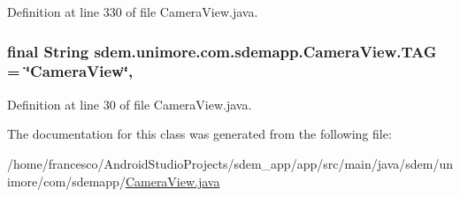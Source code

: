 Definition at line 330 of file Camera\+View.\+java.

\hypertarget{classsdem_1_1unimore_1_1com_1_1sdemapp_1_1_camera_view_a8a53915e6431e00f1220c305d16e999e}{
\subsubsection[{T\+A\+G}]{\setlength{\rightskip}{0pt plus 5cm}final String sdem.\+unimore.\+com.\+sdemapp.\+Camera\+View.\+T\+A\+G = \char`\"{}Camera\+View\char`\"{}\hspace{0.3cm}{\ttfamily [static]}, {\ttfamily [private]}}}\label{classsdem_1_1unimore_1_1com_1_1sdemapp_1_1_camera_view_a8a53915e6431e00f1220c305d16e999e}


Definition at line 30 of file Camera\+View.\+java.



The documentation for this class was generated from the following file\+:\begin{DoxyCompactItemize}
\item 
/home/francesco/\+Android\+Studio\+Projects/sdem\+\_\+app/app/src/main/java/sdem/unimore/com/sdemapp/\hyperlink{_camera_view_8java}{Camera\+View.\+java}\end{DoxyCompactItemize}

